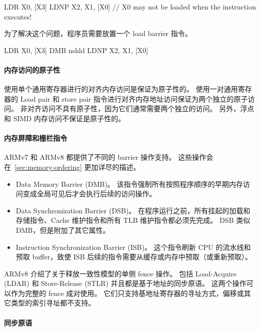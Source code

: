 \begin{lstcode}
  LDR X0, [X3]
  LDNP X2, X1, [X0] // X0 may not be loaded when the instruction executes!
\end{lstcode}

为了解决这个问题，程序员需要放置一个 load barrier 指令。

\begin{lstcode}
  LDR X0, [X3]
  DMB nshld
  LDNP X2, X1, [X0]
\end{lstcode}

\paragraph{内存访问的原子性}

使用单个通用寄存器进行的对齐内存访问是保证为原子性的。
使用一对通用寄存器的 Load pair 和 store pair 指令进行对齐内存地址访问保证为两个独立的原子访问。
非对齐访问不具有原子性，因为它们通常需要两个独立的访问。
另外，浮点和 SIMD 内存访问不保证是原子性的。

\paragraph{内存屏障和栅栏指令}

ARMv7 和 ARMv8 都提供了不同的 barrier 操作支持。
这些操作会在~\ref{sec:memory-ordering} 更加详尽的描述。

\begin{itemize}
  \item Data Memory Barrier (DMB)。
  该指令强制所有按照程序顺序的早期内存访问变成全局可见后才会执行后续的访问操作。
  \item Data Synchronization Barrier (DSB)。
    在程序运行之前，所有挂起的加载和存储指令、Cache 维护指令和所有 TLB 维护指令都必须先完成。
    DSB 类似 DMB，但是附加了其它属性。
  \item Instruction Synchronization Barrier (ISB)。
    这个指令刷新 CPU 的流水线和预取 buffer，致使 ISB 后续的指令需要从缓存或内存中预取（或重新预取）。
\end{itemize}

ARMv8 介绍了关于释放一致性模型的单侧 fence 操作。
包括 Load-Acquire (LDAR) 和 Store-Release (STLR) 并且都是基于地址的同步原语。
这两个操作可以作为完整的 fence 成对使用。
它们只支持基地址寄存器的寻址方式，偏移或其它类型的索引寻址都不支持。

\paragraph{同步原语}

